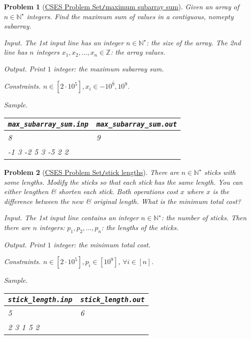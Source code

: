 \documentclass{article}
\newtheorem{problem}{Problem}
\begin{document}
\begin{problem}[\href{https://cses.fi/problemset/task/1643}{CSES Problem Set{\tt/}maximum subarray sum}]
    Given an array of $n\in\mathbb{N}^\star$ integers. Find the maximum sum of values in a contiguous, nomepty subarray.
    \item {\sf Input.} The 1st input line has an integer $n\in\mathbb{N}^\star$: the size of the array. The 2nd line has $n$ integers $x_1,x_2,\ldots,x_n\in\mathbb{Z}$: the array values.
    \item {\sf Output.} Print $1$ integer: the maximum subarray sum.
    \item {\sf Constraints.} $n\in[2\cdot10^5],x_i\in\overline{-10^9,10^9}$.
    \item {\sf Sample.}
    \begin{table}[H]
        \centering
        \begin{tabular}{|l|l|}
            \hline
            \verb|max_subarray_sum.inp| & \verb|max_subarray_sum.out| \\
            \hline
            8 & 9 \\
            -1 3 -2 5 3 -5 2 2 & \\
            \hline
        \end{tabular}
    \end{table}
\end{problem}

\begin{problem}[\href{https://cses.fi/problemset/task/1074}{CSES Problem Set{\tt/}stick lengths}]
    There are $n\in\mathbb{N}^\star$ sticks with some lengths. Modify the sticks so that each stick has the same length. You can either lengthen \& shorten each stick. Both operations cost $x$ where $x$ is the difference between the new \& original length. What is the minimum total cost?
    \item {\sf Input.} The 1st input line contains an integer $n\in\mathbb{N}^\star$: the number of sticks. Then there are $n$ integers: $p_1,p_2,\ldots,p_n$: the lengths of the sticks.
    \item {\sf Output.} Print $1$ integer: the minimum total cost.
    \item {\sf Constraints.} $n\in[2\cdot10^5],p_i\in[10^9]$, $\forall i\in[n]$.
    \item {\sf Sample.}
    \begin{table}[H]
        \centering
        \begin{tabular}{|l|l|}
            \hline
            \verb|stick_length.inp| & \verb|stick_length.out| \\
            \hline
            5 & 6 \\
            2 3 1 5 2 & \\
            \hline
        \end{tabular}
    \end{table}
\end{problem}
\end{document}

